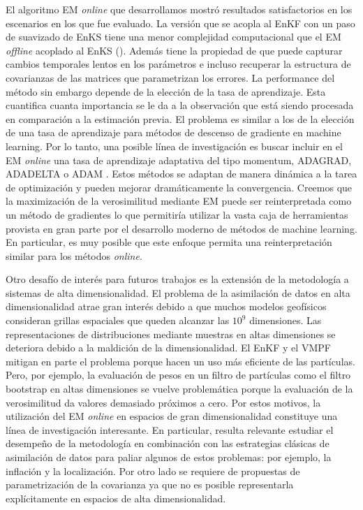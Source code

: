 El algoritmo EM \textit{online} que desarrollamos mostró resultados satisfactorios en los escenarios en los que fue evaluado. La versión que se acopla al EnKF con un paso de suavizado de EnKS tiene una menor complejidad computacional que el EM \textit{offline} acoplado al EnKS (\cite{Pulido2018}). Además tiene la propiedad de que puede capturar cambios temporales lentos en los parámetros e incluso recuperar la estructura de covarianzas de las matrices que parametrizan los errores. La performance del método sin embargo depende de la elección de la tasa de aprendizaje. Esta cuantifica cuanta importancia se le da a la observación que está siendo procesada en comparación a la estimación previa. El problema es similar a los de la elección de una tasa de aprendizaje para métodos de descenso de gradiente en machine learning. Por lo tanto, una posible línea de investigación es buscar incluir en el EM \textit{online} una tasa de aprendizaje adaptativa del tipo momentum, ADAGRAD, ADADELTA o ADAM \citep{Zeiler2012, Kingma2014}. Estos métodos se adaptan de manera dinámica a la tarea de optimización y pueden mejorar dramáticamente la convergencia. Creemos que la maximización de la verosimilitud mediante EM puede ser reinterpretada como un método de gradientes lo que permitiría utilizar la vasta caja de herramientas provista en gran parte por el desarrollo moderno de métodos de machine learning. En particular, es muy posible que este enfoque permita una reinterpretación similar para los métodos \textit{online}.

Otro desafío de interés para futuros trabajos es la extensión de la metodología a sistemas de alta dimensionalidad. El problema de la asimilación de datos en alta dimensionalidad atrae gran interés debido a que muchos modelos geofísicos consideran grillas espaciales que queden alcanzar las $10^9$ dimensiones. Las representaciones de distribuciones mediante muestras en altas dimensiones se deteriora debido a la maldición de la dimensionalidad. El EnKF y el VMPF mitigan en parte el problema porque hacen un uso más eficiente de las partículas. Pero, por ejemplo, la evaluación de pesos en un filtro de partículas como el filtro bootstrap en altas dimensiones se vuelve problemática porque la evaluación de la verosimilitud da valores demasiado próximos a cero. Por estos motivos, la utilización del EM \textit{online} en espacios de gran dimensionalidad constituye una línea de investigación interesante. En particular, resulta relevante estudiar el desempeño de la metodología en combinación con las estrategias clásicas de asimilación de datos para paliar algunos de estos problemas: por ejemplo, la inflación y la localización. Por otro lado se requiere de propuestas de parametrización de la covarianza ya que no es posible representarla explícitamente en espacios de alta dimensionalidad.

